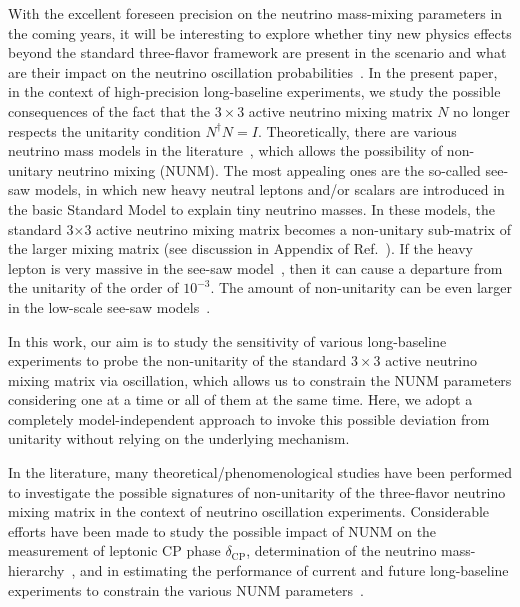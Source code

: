 \documentclass[11pt,a4paper]{article}
\begin{document}
With the excellent foreseen precision on the neutrino mass-mixing parameters in the coming years, it will be interesting to explore whether tiny new physics effects beyond the standard three-flavor framework are present in the scenario and what are their impact on the neutrino oscillation probabilities~\cite{Fong:2016yyh}. In the present paper, in the context of high-precision long-baseline experiments, we study the possible consequences of the fact that the $3\times3$ active neutrino mixing matrix $N$ no longer respects the unitarity condition $N^\dagger N=I$. Theoretically, there are various neutrino mass models in the literature~\cite{Mohapatra:1986bd, Mohapatra:1979ia, Akhmedov:1995vm, Malinsky:2009gw}, which allows the possibility of non-unitary neutrino mixing (NUNM).
The most appealing ones are the so-called see-saw models, in which new heavy neutral leptons and/or scalars are introduced in the basic Standard Model to 
explain tiny neutrino masses.
 In these models, the standard 3$\times$3 active neutrino mixing matrix becomes a non-unitary sub-matrix of the larger mixing matrix (see discussion in Appendix of Ref.~\cite{Escrihuela:2015wra}). If the heavy lepton is very massive in the see-saw model~\cite{deGouvea:2015euy,Blennow:2016jkn, Escrihuela:2016ube}, then it can cause a departure from the unitarity of the order of 
 $10^{-3}$. The amount of non-unitarity can be even larger in the low-scale see-saw models~\cite{Akhmedov:1995ip,Malinsky:2009df}.
 
In this work, our aim is to study the sensitivity of various long-baseline experiments to probe the non-unitarity of the standard $3\times3$ active neutrino mixing matrix via oscillation, which allows us to constrain the NUNM parameters considering one at a time or all of them at the same time. Here, we adopt a completely model-independent approach to invoke this possible deviation from unitarity without relying on the underlying mechanism.
 
In the literature, many theoretical/phenomenological studies have been performed to investigate the possible signatures of non-unitarity of the three-flavor neutrino mixing matrix in the context of neutrino oscillation experiments. Considerable efforts have been made to study the possible impact of NUNM on the measurement of leptonic CP phase $\delta_{\mathrm{CP}}$, determination of the neutrino mass-hierarchy~\cite{Li:2015oal,Parke:2015goa,Ge:2016xya,Miranda:2016wdr,Dutta:2016czj,Pas:2016qbg}, and in
estimating the performance of current and future long-baseline experiments to constrain the various NUNM parameters~\cite{Antusch:2006vwa,Miranda:2019ynh,DeGouvea:2019kea,Escrihuela:2015wra,Fernandez-Martinez:2016lgt,Forero:2021azc,Ellis:2020hus,Coloma:2021uhq,Hu:2020oba,Blennow:2016jkn,Abe:2017jit,Dutta:2019hmb}.
\end{document}
